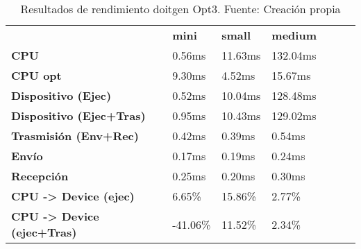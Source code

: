 \begin{table}[H]
    \centering
    \begin{tabular}{lllllll}
    \rowcolor[HTML]{DAE8FC} \ &  \textbf{mini} &  \textbf{	small} &  \textbf{	medium} \\
    \cellcolor[HTML]{DAE8FC} \textbf{CPU} & 0.56ms & 	11.63ms & 	132.04ms \\
    \rowcolor[HTML]{EFEFEF} \cellcolor[HTML]{DAE8FC} \textbf{CPU opt} & 9.30ms & 	4.52ms & 	15.67ms \\
    \cellcolor[HTML]{DAE8FC} \textbf{Dispositivo (Ejec)} & 0.52ms & 	10.04ms & 	128.48ms \\
    \rowcolor[HTML]{EFEFEF} \cellcolor[HTML]{DAE8FC} \textbf{Dispositivo (Ejec+Tras)} & 0.95ms & 	10.43ms & 	129.02ms \\
    \cellcolor[HTML]{DAE8FC} \textbf{Trasmisión (Env+Rec)} & 0.42ms & 	0.39ms & 	0.54ms \\
    \rowcolor[HTML]{EFEFEF} \cellcolor[HTML]{DAE8FC} \textbf{Envío} & 0.17ms & 	0.19ms & 	0.24ms \\
    \cellcolor[HTML]{DAE8FC} \textbf{Recepción} & 0.25ms & 	0.20ms & 	0.30ms \\
    \rowcolor[HTML]{EFEFEF} \cellcolor[HTML]{DAE8FC} \textbf{CPU -> Device (ejec)} & 6.65\% & 	15.86\% & 	2.77\% \\
    \cellcolor[HTML]{DAE8FC} \textbf{CPU -> Device (ejec+Tras)} & -41.06\% & 	11.52\% & 	2.34\% \\
    \end{tabular}
    \caption[Resultados de rendimiento doitgen Opt3]{{Resultados de rendimiento doitgen Opt3. Fuente: Creación propia}}
    \label{table_test_doitgen_Opt3_hw_performanceResults}
\end{table}